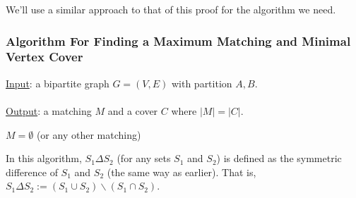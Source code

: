 \documentclass[]{article}
\theoremstyle{definition}
\begin{document}
			We'll use a similar approach to that of this proof for the algorithm we need.

			\subsubsection{Algorithm For Finding a Maximum Matching and Minimal Vertex Cover}
				\underline{Input}: a bipartite graph $G = (V, E)$ with partition $A, B$.
				\\ \\
				\underline{Output}: a matching $M$ and a cover $C$ where $|M| = |C|$. \\

				\begin{algorithm}[H]
					$M = \emptyset$ (or any other matching)\;
				\end{algorithm}

				In this algorithm, $S_1 \Delta S_2$ (for any sets $S_1$ and $S_2$) is defined as the symmetric difference of $S_1$ and $S_2$ (the same way as earlier). That is, $S_1 \Delta S_2 := (S_1 \cup S_2) \backslash (S_1 \cap S_2)$.
\end{document}
